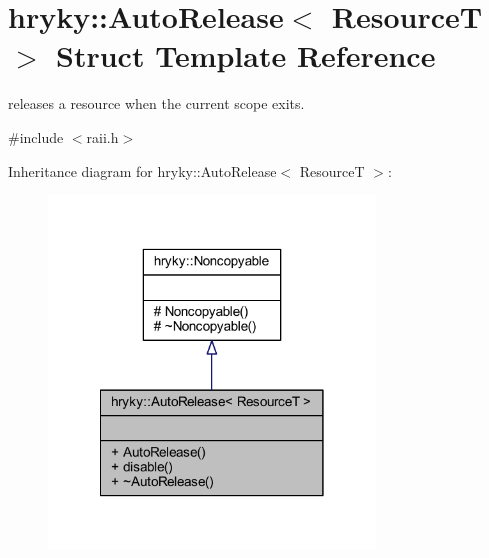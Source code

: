 \hypertarget{structhryky_1_1_auto_release}{\section{hryky\-:\-:Auto\-Release$<$ Resource\-T $>$ Struct Template Reference}
\label{structhryky_1_1_auto_release}
}


releases a resource when the current scope exits.  




{\ttfamily \#include $<$raii.\-h$>$}



Inheritance diagram for hryky\-:\-:Auto\-Release$<$ Resource\-T $>$\-:\nopagebreak
\begin{figure}[H]
\begin{center}
\leavevmode
\includegraphics[width=246pt]{structhryky_1_1_auto_release__inherit__graph}
\end{center}
\end{figure}

